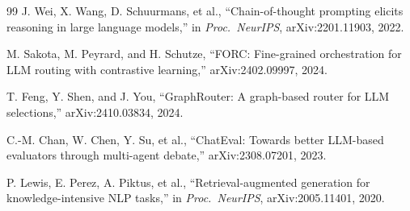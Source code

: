 \documentclass[conference]{IEEEtran}
\begin{document}
\begin{thebibliography}{99}
J. Wei, X. Wang, D. Schuurmans, et al., ``Chain-of-thought prompting elicits reasoning in large language models,'' in \textit{Proc.\ NeurIPS}, arXiv:2201.11903, 2022.

M. Sakota, M. Peyrard, and H. Schutze, ``FORC: Fine-grained orchestration for LLM routing with contrastive learning,'' arXiv:2402.09997, 2024.

T. Feng, Y. Shen, and J. You, ``GraphRouter: A graph-based router for LLM selections,'' arXiv:2410.03834, 2024.

C.-M. Chan, W. Chen, Y. Su, et al., ``ChatEval: Towards better LLM-based evaluators through multi-agent debate,'' arXiv:2308.07201, 2023.

P. Lewis, E. Perez, A. Piktus, et al., ``Retrieval-augmented generation for knowledge-intensive NLP tasks,'' in \textit{Proc.\ NeurIPS}, arXiv:2005.11401, 2020.

\end{thebibliography}
\end{document}
